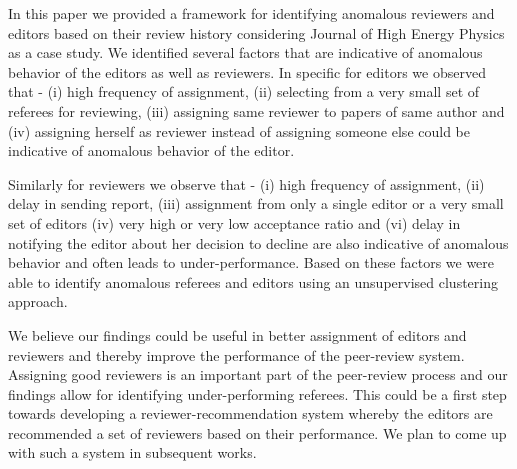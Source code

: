 \noindent

In this paper we provided a framework for identifying anomalous reviewers and editors based on  their review history considering Journal of High Energy Physics as a case study. We identified several factors that are indicative of anomalous behavior of the editors as well as reviewers. In specific for editors we observed that - 
(i) high frequency of assignment, (ii) selecting from a very small set of referees for reviewing, (iii) assigning same reviewer to papers of same author and (iv) assigning herself as reviewer instead of assigning someone else could be indicative of anomalous behavior of the editor. 

Similarly for reviewers we observe that - 
(i) high frequency of assignment, (ii) delay in sending report, (iii) assignment from only a single editor or a very small set of editors (iv) 
very high or very low acceptance ratio and (vi) delay in notifying the editor about her decision to decline are also indicative of anomalous behavior and often leads to under-performance. Based on these factors we were able to identify anomalous referees and editors using an unsupervised clustering approach. 

 We believe our findings could be useful in better assignment of editors and reviewers and thereby improve the performance of the peer-review system. Assigning good reviewers is an important part of the peer-review process and our findings allow for identifying under-performing referees. This could be a first step towards developing a reviewer-recommendation system whereby the editors are recommended a set of reviewers based on their performance. 
We plan to come up with such a system in subsequent works.
